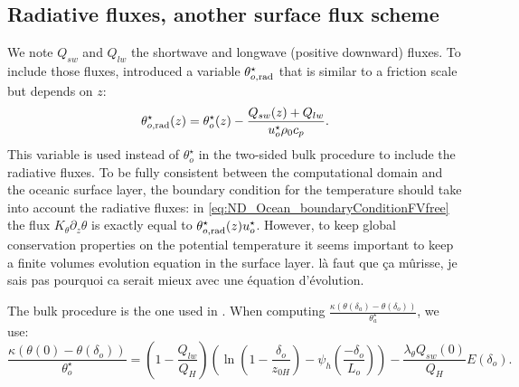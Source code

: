 \subsection{Radiative fluxes, another surface flux scheme}
\label{sec:ND_Ocean_radiativeFluxes}
We note $Q_{sw}$ and $Q_{lw}$ the shortwave and longwave (positive
downward) fluxes.
To include those fluxes, \cite{pelletier_two-sided_2021} introduced
a variable $\theta^\star_{o, \rm rad}$
that is similar to a friction scale but depends on $z$:
\begin{equation}
\theta^\star_{o, \rm rad}(z) =
	\theta^\star_{o}(z) -
	\frac{Q_{sw}(z) + Q_{lw}}{u^{\star}_o\rho_0 c_p}.
\end{equation}
This variable is used instead of $\theta^\star_{o}$
in the two-sided bulk procedure to include the radiative fluxes.
To be fully consistent between the computational domain and
the oceanic surface layer, the boundary condition for the temperature
should take into account the radiative fluxes: in
\eqref{eq:ND_Ocean_boundaryConditionFVfree} the flux
$K_\theta \partial_z \theta$ is exactly equal to
$\theta^\star_{o, \rm rad}(z) u^\star_{o}$.
However, to keep global conservation properties on the potential
temperature it seems important to keep a finite volumes
evolution equation in the surface layer.
{\color{red} là faut que ça mûrisse,
je sais pas pourquoi ca serait mieux avec une équation d'évolution}.
%
\par
The bulk procedure is the one used in
\citep{pelletier_two-sided_2021}.
When computing
$\frac{\kappa (\theta(\delta_a) - \theta(\delta_o))}
	{\theta_a^{\star}}$,
	we use:
\begin{equation}
	\label{eq:ND_Ocean_skinbulk}
	\frac{\kappa (\theta(0) - \theta(\delta_o))}
	{\theta_o^{\star}} = (1 -
	\frac{Q_{lw}}{Q_H})
	\left(\ln (1 - \frac{\delta_o}{z_{0H}}) -
	\psi_h(\frac{-\delta_o}{L_o})\right)
	- \frac{\lambda_\theta Q_{sw}(0)}
	{Q_H} E(\delta_o).
\end{equation}
